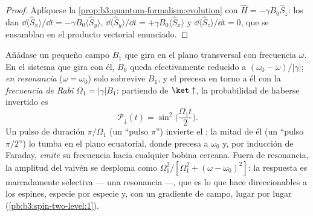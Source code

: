 \begin{proof}
Aplíquese la \cref{prop:b3:quantum-formalism:evolution} con $\hat H =
-\gamma B_0\hat S_z$: los  dan $\dd\langle\hat
S_x\rangle/\dd t = -\gamma B_0\langle\hat S_y\rangle$,
$\dd\langle\hat S_y\rangle/\dd t = +\gamma B_0\langle\hat
S_x\rangle$ y $\dd\langle\hat S_z\rangle/\dd t = 0$, que
se ensamblan en el producto vectorial enunciado.
\end{proof}

\begin{proposition}\label{prop:b3:spin-two-level:rabi}
Añádase un pequeño campo $B_1$ que gira en el plano transversal con
frecuencia $\omega$. En el sistema que gira con él, $B_0$ queda
efectivamente reducido a $(\omega_0 - \omega)/|\gamma|$; \emph{en
resonancia} ($\omega = \omega_0$) solo sobrevive $B_1$, y el 
precesa en torno a él con la \emph{frecuencia de Rabi} $\Omega_1 =
|\gamma|B_1$: partiendo de $\ket\uparrow$, la probabilidad de
haberse invertido es
\[
\mathcal P_\downarrow(t) = \sin^2\Big(\frac{\Omega_1t}{2}\Big) .
\]
Un pulso de duración $\pi/\Omega_1$ (un ``pulso $\pi$'') invierte el
; la mitad de él (un ``pulso $\pi/2$'') lo tumba en el plano
ecuatorial, donde precesa a $\omega_0$ y, por inducción de Faraday,
\emph{emite} su frecuencia hacia cualquier bobina cercana. Fuera de
resonancia, la amplitud del vaivén se desploma como $\Omega_1^2/[\Omega_1^2 +
(\omega - \omega_0)^2]$: la respuesta es marcadamente selectiva --- una
resonancia ---, que es lo que hace direccionables a los espines,
especie por especie y, con un gradiente de campo, lugar por lugar
(\cref{pb:b3:spin-two-level:1}).
\end{proposition}
\admitted

